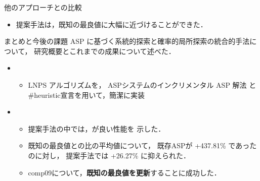 \documentclass[11pt,dvipdfmx]{beamer}
\begin{document}
\begin{frame}{他のアプローチとの比較}
  \begin{center}
  \begin{tableB}
    
  \end{tableB}
  \end{center}
  \begin{itemize}
  \item 提案手法は，既知の最良値に大幅に近づけることができた． 
  \end{itemize}
\end{frame}
\begin{frame}{まとめと今後の課題}
  ASP に基づく系統的探索と確率的局所探索の統合的手法について，
  研究概要とこれまでの成果について述べた．

  \begin{itemize}
    \item {}
      \begin{itemize}
      \item LNPS アルゴリズムを，
        ASPシステム{\clingo}のインクリメンタル ASP 解法
        と\#heuristic宣言を用いて，簡潔に実装
      \end{itemize}
    \item {}
      \begin{itemize}
      \item 提案手法の中では，が良い性能を
        示した．
      \item 既知の最良値との比の平均値について，
      既存ASPが +437.81\% であったのに対し，
      提案手法では +26.27\% に抑えられた．
      \item \textsf{comp09}について，\alert{\bf 既知の最良値を更新}することに成功した．
      \end{itemize}
    \end{itemize}


\end{frame}
\end{document}
